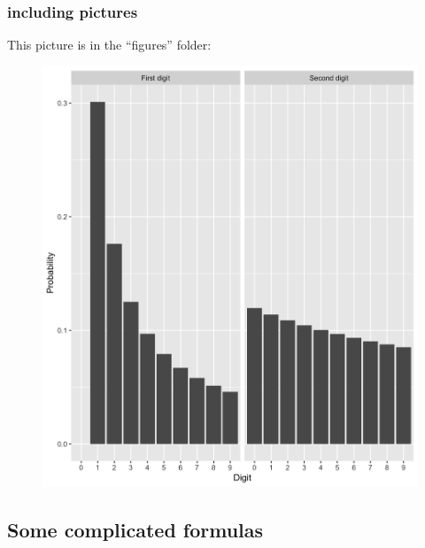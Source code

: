 \begin{frame}
	\frametitle{including pictures}

This picture is in the ``figures'' folder:

\begin{figure}
\includegraphics[scale=.075]{figures/benford.png}
\end{figure}

\end{frame}





\subsection{Some complicated formulas}

